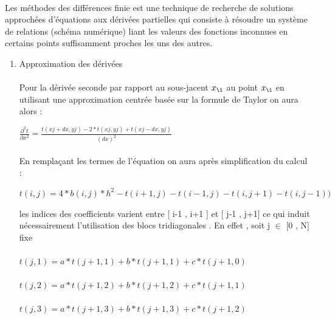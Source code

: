 \documentclass{article}
\begin{document}
    \paragraph{} 
    Les méthodes des différences finie est une technique de recherche de solutions 
    approchées d’équations aux dérivées partielles qui consiste à résoudre un
    système de relations (schéma numérique) liant les valeurs des fonctions 
    inconnues en certains points suffisamment proches les uns des autres. 
   \begin{enumerate}
   	\item { Approximation des dérivées }
   	\paragraph{}
   
 	Pour la dérivée seconde par rapport au sous-jacent $ x_{\i}$ au point $ x_{\i}$ 
   en utilisant une approximation centrée basée sur la formule de Taylor  on aura alors : 
   	
   $	$$\frac{\partial^2 t}{\partial x^2}$$  = $$\frac{t( xj + dx , yj ) - 2*t( xj , yj ) + t( xj-dx , yj)}{(dx)^2 }$$ $ 
   
   \paragraph{}
   	En remplaçant les termes de l'équation %
   	on aura après simplification du calcul :
   	
   	$t ( i , j ) = 4 *b(i , j ) * h^2 - t(i+1 , j) - t(i-1 , j)-t(i , j+1)-t(i , j-1))$ 
   	
   	les indices des coefficients varient entre [ i-1 , i+1 ] et [ j-1 , j+1] 
   	ce qui induit nécessairement l'utilisation des blocs tridiagonales . En effet  , 
   	soit j $\in$ [0 , N] fixe 
   	\paragraph{}
   	$t(j,1) = a*t(j+1 , 1) + b*t(j+1,1) + c*t(j+1,0)$
   	\paragraph{}
    $t(j,2) = a*t(j+1 , 2) + b*t(j+1,2) + c*t(j+1,1)$
    \paragraph{}
    $t(j,3) = a*t(j+1 , 3) + b*t(j+1,3) + c*t(j+1,2)$ 

\end{enumerate}
\end{document}
